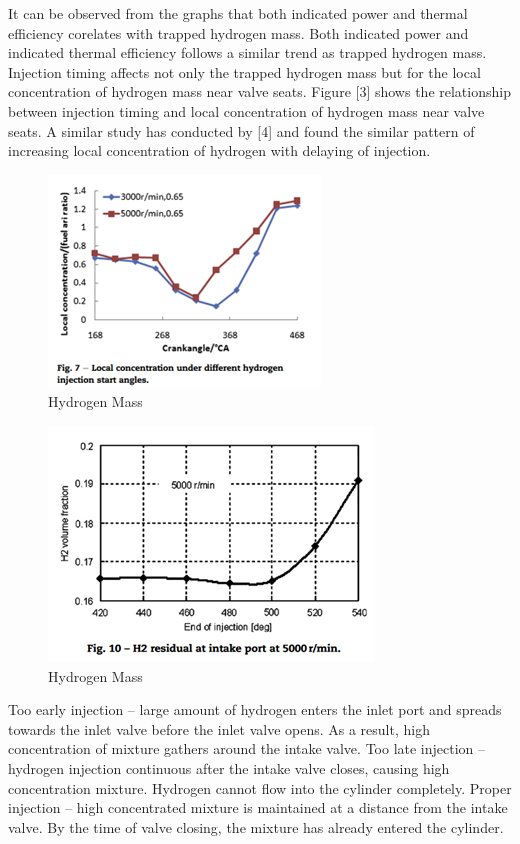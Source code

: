 \documentclass[conference]{IEEEtran}
\begin{document}
It can be observed from the graphs that both indicated power and thermal efficiency corelates with trapped hydrogen mass. Both indicated power and indicated thermal efficiency follows a similar trend as trapped hydrogen mass. 
Injection timing affects not only the trapped hydrogen mass but for the local concentration of hydrogen mass near valve seats. Figure [3] shows the relationship between injection timing and local concentration of hydrogen mass near valve seats. A similar study has conducted by [4] and found the similar pattern of increasing local concentration of hydrogen with delaying of injection.
 
\begin{figure}[htbp]
    \centerline{\includegraphics{figures/LR_IT_4.png}}
    \caption{Hydrogen Mass}
    \label{lr_it_4}
    \end{figure}

\begin{figure}[htbp]
    \centerline{\includegraphics{figures/LR_IT_5.png}}
    \caption{Hydrogen Mass}
    \label{lr_it_5}
    \end{figure}

Too early injection – large amount of hydrogen enters the inlet port and spreads towards the inlet valve before the inlet valve opens. As a result, high concentration of mixture gathers around the intake valve.
Too late injection – hydrogen injection continuous after the intake valve closes, causing high concentration mixture. Hydrogen cannot flow into the cylinder completely.
Proper injection – high concentrated mixture is maintained at a distance from the intake valve. By the time of valve closing, the mixture has already entered the cylinder.
\end{document}
